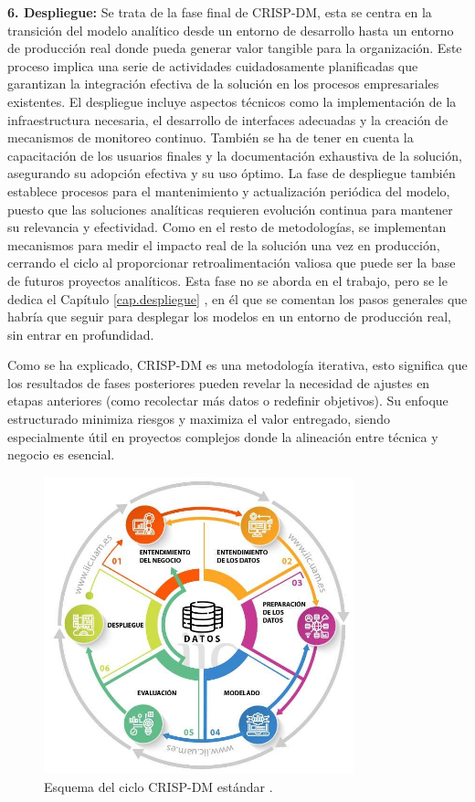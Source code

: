 \textbf{6. Despliegue:} Se trata de la fase final de CRISP-DM, esta se centra en la transición del modelo analítico desde un entorno de desarrollo hasta un entorno de producción real donde pueda generar valor tangible para la organización. Este proceso implica una serie de actividades cuidadosamente planificadas que garantizan la integración efectiva de la solución en los procesos empresariales existentes. El despliegue incluye aspectos técnicos como la implementación de la infraestructura necesaria, el desarrollo de interfaces adecuadas y la creación de mecanismos de monitoreo continuo. También se ha de tener en cuenta la capacitación de los usuarios finales y la documentación exhaustiva de la solución, asegurando su adopción efectiva y su uso óptimo. La fase de despliegue también establece procesos para el mantenimiento y actualización periódica del modelo, puesto que las soluciones analíticas requieren evolución continua para mantener su relevancia y efectividad. Como en el resto de metodologías, se implementan mecanismos para medir el impacto real de la solución una vez en producción, cerrando el ciclo al proporcionar retroalimentación valiosa que puede ser la base de futuros proyectos analíticos. Esta fase no se aborda en el trabajo, pero se le dedica el Capítulo \ref{cap.despliegue} , en él que se comentan los pasos generales que habría que seguir para desplegar los modelos en un entorno de producción real, sin entrar en profundidad.

Como se ha explicado, CRISP-DM es una metodología iterativa, esto significa que los resultados de fases posteriores pueden revelar la necesidad de ajustes en etapas anteriores (como recolectar más datos o redefinir objetivos). Su enfoque estructurado minimiza riesgos y maximiza el valor entregado, siendo especialmente útil en proyectos complejos donde la alineación entre técnica y negocio es esencial.

\begin{figure}[H]
    \centering
    \includegraphics[width=0.8\textwidth]{./img/metodologia/crispdm.jpeg}
    \caption{Esquema del ciclo CRISP-DM estándar \cite{haya_crisp_dm}.}
    \label{fig:CRISP-DM}
\end{figure}

